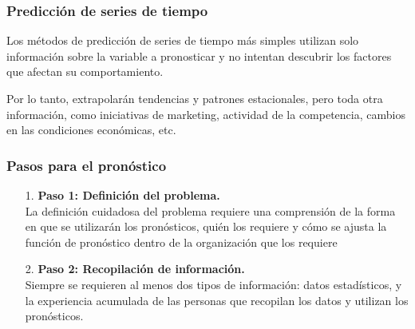 \documentclass[10pt]{beamer}
\begin{document}


\begin{frame}
\frametitle{Predicción de series de tiempo}

Los métodos de predicción de series de tiempo más simples utilizan solo información sobre la variable a pronosticar y no intentan descubrir los factores que afectan su comportamiento. 

\vspace{4mm}

Por lo tanto, extrapolarán tendencias y patrones estacionales, pero  toda otra información, como iniciativas de marketing, actividad de la competencia, cambios en las condiciones económicas, etc.

\begin{center}
\end{center}

\end{frame}






\begin{frame}
\frametitle{Pasos para el pronóstico}


\begin{enumerate}
\item[1.] \textbf{Paso 1: Definición del problema.} \\
La definición cuidadosa del problema requiere una comprensión de la forma en que se utilizarán los pronósticos, quién los requiere y cómo se ajusta la función de pronóstico dentro de la organización que los requiere
\vspace{2mm}
\item[2.] \textbf{Paso 2: Recopilación de información.} \\
Siempre se requieren al menos dos tipos de información:  datos estadísticos, y  la experiencia acumulada de las personas que recopilan los datos y utilizan los pronósticos. 
\end{enumerate}

\end{frame}


\end{document}
